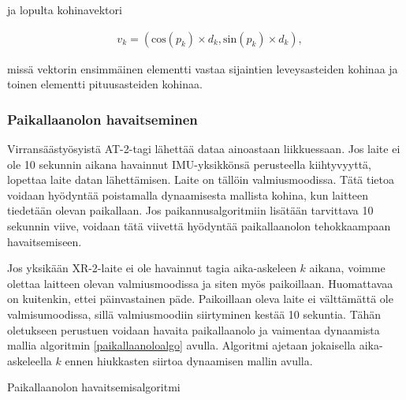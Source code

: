 \documentclass[
  12pt,
  a4paper, twoside]{book}
\begin{document}
\noindent ja lopulta kohinavektori

\begin{align}
&v_k = (\text{cos}(p_k) \times d_k, \text{sin}(p_k) \times d_k),
\end{align}

\noindent missä vektorin ensimmäinen elementti vastaa sijaintien leveysasteiden kohinaa ja toinen elementti pituusasteiden kohinaa.

\hypertarget{paikallaanolon-havaitseminen}{%
\subsubsection{Paikallaanolon havaitseminen}\label{paikallaanolon-havaitseminen}}

Virransäästyösyistä AT-2-tagi lähettää dataa ainoastaan liikkuessaan. Jos laite ei ole 10 sekunnin aikana havainnut IMU-yksikkönsä perusteella kiihtyvyyttä, lopettaa laite datan lähettämisen. Laite on tällöin valmiusmoodissa. Tätä tietoa voidaan hyödyntää poistamalla dynaamisesta mallista kohina, kun laitteen tiedetään olevan paikallaan. Jos paikannusalgoritmiin lisätään tarvittava 10 sekunnin viive, voidaan tätä viivettä hyödyntää paikallaanolon tehokkaampaan havaitsemiseen.

Jos yksikään XR-2-laite ei ole havainnut tagia aika-askeleen \(k\) aikana, voimme olettaa laitteen olevan valmiusmoodissa ja siten myös paikoillaan. Huomattavaa on kuitenkin, ettei päinvastainen päde. Paikoillaan oleva laite ei välttämättä ole valmisumoodissa, sillä valmiusmoodiin siirtyminen kestää 10 sekuntia. Tähän oletukseen perustuen voidaan havaita paikallaanolo ja vaimentaa dynaamista mallia algoritmin \ref{paikallaanoloalgo} avulla. Algoritmi ajetaan jokaisella aika-askeleella \(k\) ennen hiukkasten siirtoa dynaamisen mallin avulla.

\begin{algorithm}[H]
\label{paikallaanoloalgo}
\DontPrintSemicolon
\SetAlgoShortEnd
{}
\caption{Paikallaanolon havaitsemisalgoritmi}
\end{algorithm}
\end{document}
